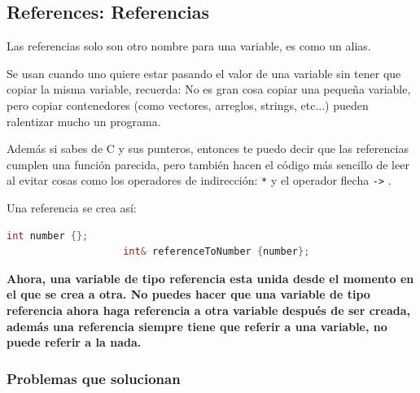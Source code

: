 \documentclass[12pt, fleqn]{report}                             %
\theoremstyle{break}                                            %
\newcommand{\textCode}[1]  { \texttt{#1} }                      %
\begin{document}
            \subsection{References: Referencias}

                Las referencias solo son otro nombre para una variable, es como un alias.

                Se usan cuando uno quiere estar pasando el valor de una variable sin tener que copiar la misma
                variable, recuerda: No es gran cosa copiar una pequeña variable, pero
                copiar contenedores (como vectores, arreglos, strings, etc...)
                pueden ralentizar mucho un programa.

                Además si sabes de C y sus punteros, entonces te puedo decir que las referencias
                cumplen una función parecida, pero también hacen el código más sencillo de leer
                al evitar cosas como los operadores de indirección: \textCode{*} y el operador flecha
                \textCode{->}.

                Una referencia se crea así:
                \begin{lstlisting}[language=C++, gobble=20]
                    int number {};
                    int& referenceToNumber {number};
                \end{lstlisting}

                \textbf{Ahora, una variable de tipo referencia esta unida desde el momento en el que se crea a otra.
                No puedes hacer que una variable de tipo referencia ahora haga referencia a otra variable después
                de ser creada, además una referencia siempre tiene que referir a una variable, no puede referir a
                la nada.}

                \clearpage

                \subsubsection{Problemas que solucionan}
\end{document}
